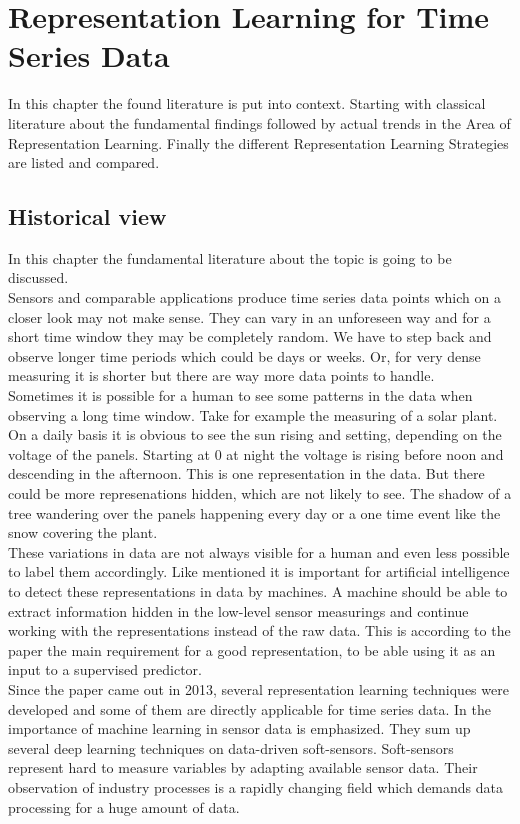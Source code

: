 \section{Representation Learning for Time Series Data}\label{review}
In this chapter the found literature is put into context. Starting with classical literature about the fundamental findings followed by actual trends in the Area of Representation Learning. Finally the different Representation Learning Strategies are listed and compared.
\subsection{Historical view}
In this chapter the fundamental literature about the topic is going to be discussed. \\
Sensors and comparable applications produce time series data points which on a closer look may not make sense. They can vary in an unforeseen way and for a short time window they may be completely random. We have to step back and observe longer time periods which could be days or weeks. Or, for very dense measuring it is shorter but there are way more data points to handle.\\
Sometimes it is possible for a human to see some patterns in the data when observing a long time window. Take for example the measuring of a solar plant. On a daily basis it is obvious to see the sun rising and setting, depending on the voltage of the panels. Starting at 0 at night the voltage is rising before noon and descending in the afternoon. This is one representation in the data. But there could be more represenations hidden, which are not likely to see. The shadow of a tree wandering over the panels happening every day or a one time event like the snow covering the plant. \\
These variations in data are not always visible for a human and even less possible to label them accordingly. Like \cite{bengio_representation_2013} mentioned it is important for artificial intelligence to detect these representations in data by machines. A machine should be able to extract information hidden in the low-level sensor measurings and continue working with the representations instead of the raw data. This is according to the paper the main requirement for a good representation, to be able using it as an input to a supervised predictor.\\
Since the paper came out in 2013, several representation learning techniques were developed and some of them are directly applicable for time series data. In \cite{sun_survey_2021} the importance of machine learning in sensor data is emphasized. They sum up several deep learning techniques on data-driven soft-sensors. Soft-sensors represent hard to measure variables by adapting available sensor data. Their observation of industry processes is a rapidly changing field which demands data processing for a huge amount of data.
